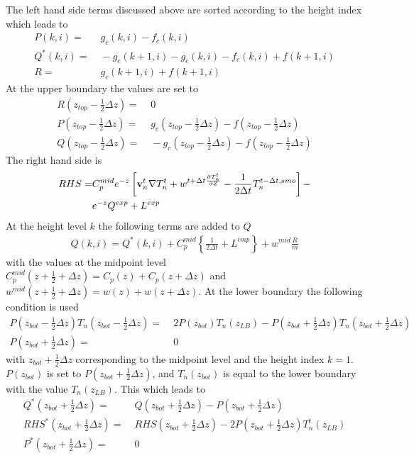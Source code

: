 %
The left hand side terms discussed above are sorted according to the
height index which leads to
%
\begin{align}
  P(k,i) = & \; g_c(k,i)-f_c(k,i) \\
  Q^*(k,i) = & \; -g_c(k+1,i)-g_c(k,i)-f_c(k,i)+f(k+1,i) \\
  R = & \; g_c(k+1,i) + f(k+1,i)
\end{align}
%
At the upper boundary the values are set to
%
\begin{align}
  R(z_{top}-\frac{1}{2} \Delta z)= & \; 0 \\
  P(z_{top}-\frac{1}{2} \Delta z) = & \; g_c(z_{top}-\frac{1}{2} \Delta z)-f(z_{top}-\frac{1}{2} \Delta z) \\
  Q(z_{top}-\frac{1}{2} \Delta z) = & \; -g_c(z_{top}-\frac{1}{2} \Delta z)-f(z_{top}-\frac{1}{2} \Delta z)
\end{align}
%
The right hand side is
%
\begin{align}
  RHS = & C_p^{mid} e^{-z} \left[ \mathbf{v}_n^t \nabla T_n^{t} + w^{t+\Delta t \frac{\partial T_n^t}{\partial Z}} -
       \frac{1}{2 \Delta t} T_n^{t-\Delta t,smo} \right] - \notag \\
   {} & e^{-z}
       Q^{exp}+ L^{exp}
\end{align}
%
At the height level $k$ the following terms are added to $Q$
%
\begin{align}
  Q(k,i) = Q^*(k,i) + C_p^{mid}\left\{ \frac{1}{2 \Delta t} + L^{imp}
  \right\} + w^{mid}\frac{R}{\overline{m}}
\end{align}
%
with the values at the midpoint level $C_p^{mid}(z+\frac{1}{2} +
\Delta z) = C_p(z) + C_p(z + \Delta z)$ and $w^{mid}(z+\frac{1}{2} +
\Delta z) = w(z) + w(z+\Delta z)$. At the lower boundary the
following condition is used
%
\begin{align}
  P(z_{bot}-\frac{1}{2}\Delta z) T_n(z_{bot}-\frac{1}{2}\Delta z) = & \;
                   2 P(z_{bot}) T_n(z_{LB}) - P(z_{bot}+\frac{1}{2}\Delta z)
  T_n(z_{bot}+\frac{1}{2}\Delta z) \\
  P(z_{bot}+\frac{1}{2} \Delta z) = & \;  0
\end{align}
%
with $z_{bot}+\frac{1}{2} \Delta z$ corresponding to the midpoint
level and the height index $k=1$. $P(z_{bot})$ is set to
$P(z_{bot}+\frac{1}{2} \Delta z)$, and $T_n(z_{bot})$ is equal to
the lower boundary with the value $T_n(z_{LB})$. This which leads to
%
\begin{align}
  Q^*(z_{bot}+\frac{1}{2} \Delta z) = & \; Q(z_{bot}+\frac{1}{2} \Delta z) - P(z_{bot}+\frac{1}{2} \Delta z) \\
  RHS^*(z_{bot}+\frac{1}{2} \Delta z) = & \; RHS(z_{bot}+\frac{1}{2} \Delta z) - 2P(z_{bot}+\frac{1}{2} \Delta z) T_n^t(z_{LB}) \\
  P^*(z_{bot}+\frac{1}{2} \Delta z) = & \; 0
\end{align}
